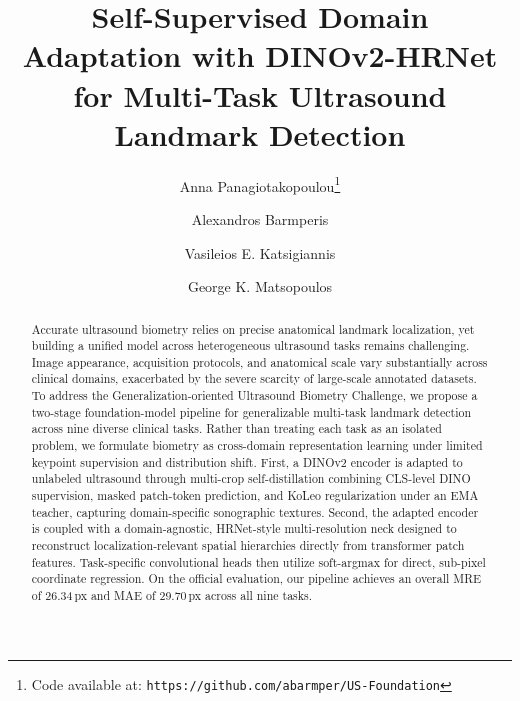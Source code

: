 \documentclass[runningheads]{llncs}
\begin{document}
\title{Self-Supervised Domain Adaptation with DINOv2-HRNet for Multi-Task Ultrasound Landmark Detection}

\author{Anna Panagiotakopoulou\thanks{Code available at: \texttt{https://github.com/abarmper/US-Foundation}} \and
Alexandros Barmperis \and
Vasileios E. Katsigiannis \and
George K. Matsopoulos}


\institute{Biomedical Engineering Laboratory, School of Electrical and Computer Engineering, \\
National Technical University of Athens, Athens, Greece\\
\email{annapan@biomed.ntua.gr, amparmperis@biomed.ntua.gr,
vassiliskat@biomed.ntua.gr, gmatsopoulos@biomed.ntua.gr} \and
Archimedes Research Unit, Athena Research Center, Athens, Greece}

\maketitle

\begin{abstract}
Accurate ultrasound biometry relies on precise anatomical landmark localization, yet building a unified model across heterogeneous ultrasound tasks remains challenging. Image appearance, acquisition protocols, and anatomical scale vary substantially across clinical domains, exacerbated by the severe scarcity of large-scale annotated datasets. To address the Generalization-oriented Ultrasound Biometry Challenge, we propose a two-stage foundation-model pipeline for generalizable multi-task landmark detection across nine diverse clinical tasks. Rather than treating each task as an isolated problem, we formulate biometry as cross-domain representation learning under limited keypoint supervision and distribution shift. First, a DINOv2 encoder is adapted to unlabeled ultrasound through multi-crop self-distillation combining CLS-level DINO supervision, masked patch-token prediction, and KoLeo regularization under an EMA teacher, capturing domain-specific sonographic textures. Second, the adapted encoder is coupled with a domain-agnostic, HRNet-style multi-resolution neck designed to reconstruct localization-relevant spatial hierarchies directly from transformer patch features. Task-specific convolutional heads then utilize soft-argmax for direct, sub-pixel coordinate regression. On the official evaluation, our pipeline achieves an overall MRE of 26.34\,px and MAE of 29.70\,px across all nine tasks.

\end{abstract}
\end{document}
